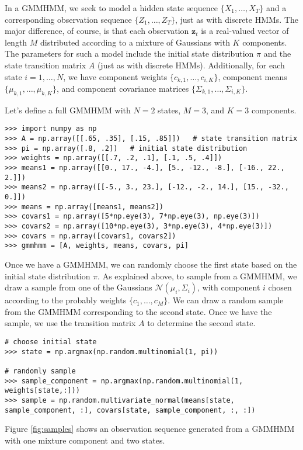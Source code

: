In a GMMHMM, we seek to model a hidden state sequence $\{X_1,\ldots, X_T\}$ and a corresponding observation sequence $\{Z_1,\ldots,Z_T\}$, just as with discrete HMMs.
The major difference, of course, is that each observation $\mathbf{z}_t$ is a real-valued vector of length $M$ distributed according to a mixture of Gaussians with $K$ components.
The parameters for such a model include the initial state distribution $\pi$ and the state transition matrix $A$ (just as with discrete HMMs).
Additionally, for each state $i=1,\ldots,N$, we have component weights $\{c_{k,1},\ldots,c_{i,K}\}$, component means $\{\mu_{k,1},\ldots,\mu_{k,K}\}$, and component covariance matrices
$\{\Sigma_{k,1},\ldots,\Sigma_{i,K}\}$.

Let's define a full GMMHMM with $N=2$ states, $M = 3$, and $K=3$ components.
\begin{lstlisting}
>>> import numpy as np
>>> A = np.array([[.65, .35], [.15, .85]])   # state transition matrix
>>> pi = np.array([.8, .2])   # initial state distribution
>>> weights = np.array([[.7, .2, .1], [.1, .5, .4]]) 
>>> means1 = np.array([[0., 17., -4.], [5., -12., -8.], [-16., 22., 2.]])
>>> means2 = np.array([[-5., 3., 23.], [-12., -2., 14.], [15., -32., 0.]])
>>> means = np.array([means1, means2])
>>> covars1 = np.array([5*np.eye(3), 7*np.eye(3), np.eye(3)])
>>> covars2 = np.array([10*np.eye(3), 3*np.eye(3), 4*np.eye(3)])
>>> covars = np.array([covars1, covars2])
>>> gmmhmm = [A, weights, means, covars, pi]
\end{lstlisting}

Once we have a GMMHMM, we can randomly choose the first state based on the initial state distribution $\pi$.
As explained above, to sample from a GMMHMM, we draw a sample from one of the Gaussians $\mathcal{N}(\mu_i, \Sigma_i)$, with component $i$ chosen according to the probably weights $\{c_{1},\ldots,c_{M}\}$.
We can draw a random sample from the GMMHMM corresponding to the second state.
Once we have the sample, we use the transition matrix $A$ to determine the second state.
\begin{lstlisting}
# choose initial state
>>> state = np.argmax(np.random.multinomial(1, pi))  

# randomly sample
>>> sample_component = np.argmax(np.random.multinomial(1, weights[state,:]))
>>> sample = np.random.multivariate_normal(means[state, sample_component, :], covars[state, sample_component, :, :])
\end{lstlisting}

Figure \ref{fig:samples} shows an observation sequence generated from a GMMHMM with one mixture component and two states.

